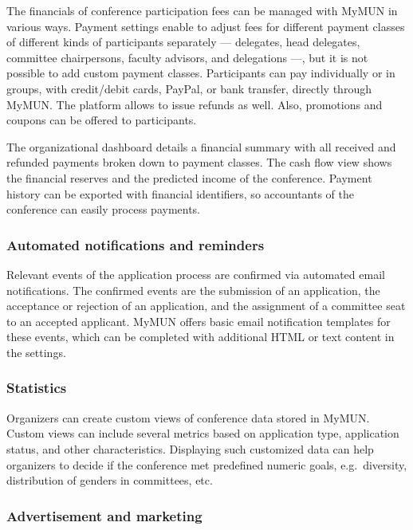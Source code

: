 The financials of conference participation fees can be managed with MyMUN in various ways. Payment settings enable to adjust fees for different payment classes of different kinds of participants separately — delegates, head delegates, committee chairpersons, faculty advisors, and delegations —, but it is not possible to add custom payment classes. Participants can pay individually or in groups, with credit/debit cards, PayPal, or bank transfer, directly through MyMUN. The platform allows to issue refunds as well. Also, promotions and coupons can be offered to participants.

The organizational dashboard details a financial summary with all received and refunded payments broken down to payment classes. The cash flow view shows the financial reserves and the predicted income of the conference. Payment history can be exported with financial identifiers, so accountants of the conference can easily process payments.

\subsubsection{Automated notifications and reminders}

Relevant events of the application process are confirmed via automated email notifications. The confirmed events are the submission of an application, the acceptance or rejection of an application, and the assignment of a committee seat to an accepted applicant. MyMUN offers basic email notification templates for these events, which can be completed with additional HTML or text content in the settings.

\subsubsection{Statistics}

Organizers can create custom views of conference data stored in MyMUN. Custom views can include several metrics based on application type, application status, and other characteristics. Displaying such customized data can help organizers to decide if the conference met predefined numeric goals, e.g.\ diversity, distribution of genders in committees, etc.

\subsubsection{Advertisement and marketing}

